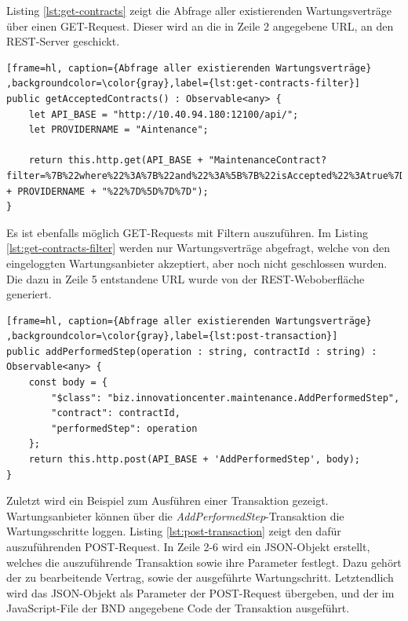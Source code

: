 Listing \ref{lst:get-contracts} zeigt die Abfrage aller existierenden Wartungsverträge über einen GET-Request. Dieser wird an die in Zeile 2 angegebene URL, an den REST-Server geschickt.

\begin{lstfloat}
\begin{lstlisting}[frame=hl, caption={Abfrage aller existierenden Wartungsverträge} ,backgroundcolor=\color{gray},label={lst:get-contracts-filter}]
public getAcceptedContracts() : Observable<any> {
    let API_BASE = "http://10.40.94.180:12100/api/";
    let PROVIDERNAME = "Aintenance";

    return this.http.get(API_BASE + "MaintenanceContract?filter=%7B%22where%22%3A%7B%22and%22%3A%5B%7B%22isAccepted%22%3Atrue%7D%2C%7B%22isClosed%22%3Afalse%7D%2C%20%7B%22maintenanceProvider%22%3A%22resource%3Abiz.innovationcenter.maintenance.MaintenanceProvider%23" + PROVIDERNAME + "%22%7D%5D%7D%7D");
}
\end{lstlisting} 
\end{lstfloat}

Es ist ebenfalls möglich GET-Requests mit Filtern auszuführen. Im Listing \ref{lst:get-contracts-filter} werden nur Wartungsverträge abgefragt, welche von den eingeloggten Wartungsanbieter akzeptiert, aber noch nicht geschlossen wurden. Die dazu in Zeile 5 entstandene URL wurde von der REST-Weboberfläche generiert. 

\begin{lstfloat}
\begin{lstlisting}[frame=hl, caption={Abfrage aller existierenden Wartungsverträge} ,backgroundcolor=\color{gray},label={lst:post-transaction}]
public addPerformedStep(operation : string, contractId : string) : Observable<any> {
    const body = {
        "$class": "biz.innovationcenter.maintenance.AddPerformedStep",
        "contract": contractId,
        "performedStep": operation
    };
    return this.http.post(API_BASE + 'AddPerformedStep', body);
}
\end{lstlisting} 
\end{lstfloat}

Zuletzt wird ein Beispiel zum Ausführen einer Transaktion gezeigt. Wartungsanbieter können über die \textit{AddPerformedStep}-Transaktion die Wartungsschritte loggen. Listing \ref{lst:post-transaction} zeigt den dafür auszuführenden POST-Request. In Zeile 2-6 wird ein JSON-Objekt erstellt, welches die auszuführende Transaktion sowie ihre Parameter festlegt. Dazu gehört der zu bearbeitende Vertrag, sowie der ausgeführte Wartungschritt. Letztendlich wird das JSON-Objekt als Parameter der POST-Request übergeben, und der im JavaScript-File der BND angegebene Code der Transaktion ausgeführt.

